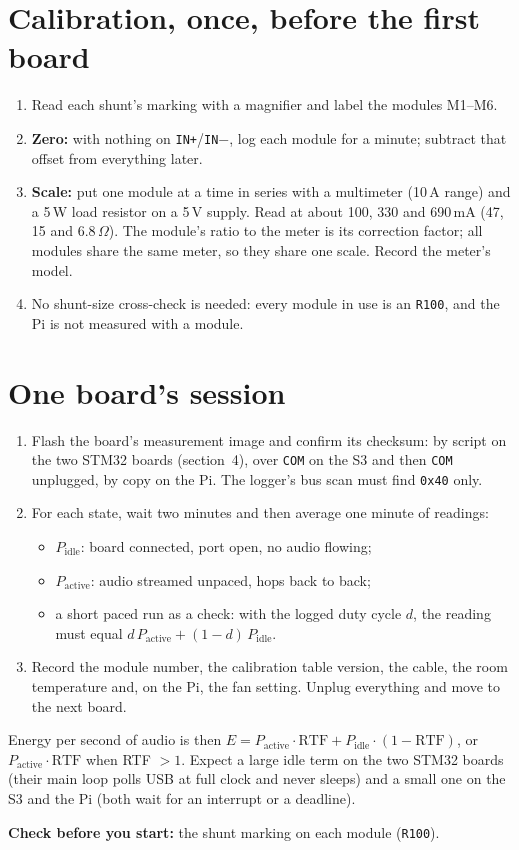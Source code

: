 \documentclass[11pt]{article}
\newcommand{\code}[1]{\texttt{#1}}
\begin{document}
\section{Calibration, once, before the first board}
\begin{enumerate}
\item Read each shunt's marking with a magnifier and label the modules M1--M6.
\item \textbf{Zero:} with nothing on \code{IN+}/\code{IN$-$}, log each module for a minute;
subtract that offset from everything later.
\item \textbf{Scale:} put one module at a time in series with a multimeter (10\,A range) and a
5\,W load resistor on a 5\,V supply. Read at about 100, 330 and 690\,mA (47, 15 and
6.8\,$\Omega$). The module's ratio to the meter is its correction factor; all modules share
the same meter, so they share one scale. Record the meter's model.
\item No shunt-size cross-check is needed: every module in use is an \code{R100}, and the Pi
is not measured with a module.
\end{enumerate}

\section{One board's session}
\begin{enumerate}
\item Flash the board's measurement image and confirm its checksum: by script on the two STM32
boards (section~4), over \code{COM} on the S3 and then \code{COM} unplugged, by copy on the Pi.
The logger's bus scan must find \code{0x40} only.
\item For each state, wait two minutes and then average one minute of readings:
\begin{itemize}
\item $P_\text{idle}$: board connected, port open, no audio flowing;
\item $P_\text{active}$: audio streamed unpaced, hops back to back;
\item a short paced run as a check: with the logged duty cycle $d$, the reading must equal
$d\,P_\text{active} + (1-d)\,P_\text{idle}$.
\end{itemize}
\item Record the module number, the calibration table version, the cable, the room
temperature and, on the Pi, the fan setting. Unplug everything and move to the next board.
\end{enumerate}

Energy per second of audio is then
$E = P_\text{active}\cdot\text{RTF} + P_\text{idle}\cdot(1-\text{RTF})$, or
$P_\text{active}\cdot\text{RTF}$ when RTF $> 1$. Expect a large idle term on the two STM32
boards (their main loop polls USB at full clock and never sleeps) and a small one on the S3
and the Pi (both wait for an interrupt or a deadline).

\textbf{Check before you start:} the shunt marking on each module (\code{R100}).
\end{document}
